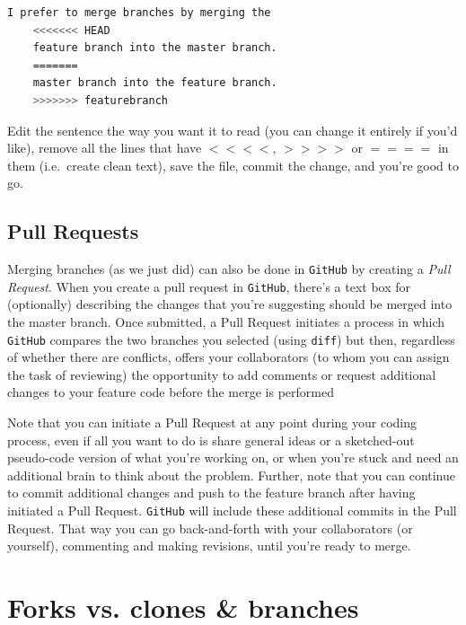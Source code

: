 \documentclass[12pt,letterpaper]{article}
\begin{document}
\begin{lstlisting}[language=bash]
	I prefer to merge branches by merging the
	<<<<<<< HEAD
	feature branch into the master branch.
	=======
	master branch into the feature branch.
	>>>>>>> featurebranch
\end{lstlisting}

\noindent
Edit the sentence the way you want it to read
(you can change it entirely if you'd like), 
remove all the lines that have $<<<<$, $>>>>$ or $====$ in them
(i.e.~create clean text), save the file, commit the change, and you're good to go.


\subsection{Pull Requests}

Merging branches (as we just did) can also be done in \texttt{GitHub} by creating a \emph{Pull Request}.
When you create a pull request in \texttt{GitHub}, there's a text box for (optionally) describing the changes that you're suggesting should be merged into the master branch.
Once submitted, a Pull Request initiates a process in which \texttt{GitHub} 
compares the two branches you selected (using \texttt{diff}) but then, 
regardless of whether there are conflicts, offers your collaborators
(to whom you can assign the task of reviewing)
the opportunity to add comments or request additional changes to your feature 
code before the merge is performed

Note that you can initiate a Pull Request at any point during your coding 
process, 
even if all you want to do is share general ideas or a sketched-out pseudo-code 
version of what you're working on, 
or when you're stuck and need an additional brain to think about the problem.
Further, note that you can continue to commit additional changes and push to 
the feature branch  after having initiated a Pull Request.
\texttt{GitHub} will include these additional commits in the Pull Request.  That 
way you can go back-and-forth with your collaborators (or yourself), 
commenting and making revisions, until you're ready to merge.



\section{Forks vs. clones \& branches}
\end{document}

